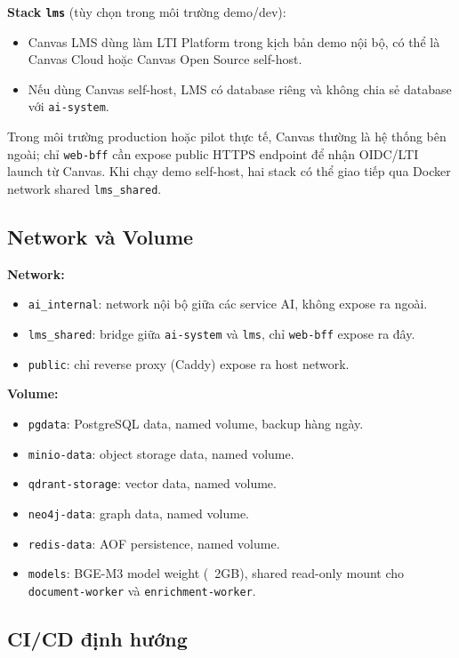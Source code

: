 \textbf{Stack \texttt{lms}} (tùy chọn trong môi trường demo/dev):
\begin{itemize}
    \item Canvas LMS dùng làm LTI Platform trong kịch bản demo nội bộ, có thể
          là Canvas Cloud hoặc Canvas Open Source self-host.
    \item Nếu dùng Canvas self-host, LMS có database riêng và không chia sẻ
          database với \texttt{ai-system}.
\end{itemize}

Trong môi trường production hoặc pilot thực tế, Canvas thường là hệ thống bên
ngoài; chỉ \texttt{web-bff} cần expose public HTTPS endpoint để nhận OIDC/LTI
launch từ Canvas. Khi chạy demo self-host, hai stack có thể giao tiếp qua Docker
network shared \texttt{lms\_shared}.

\subsection{Network và Volume}

\textbf{Network:}
\begin{itemize}
    \item \texttt{ai\_internal}: network nội bộ giữa các service AI, không
          expose ra ngoài.
    \item \texttt{lms\_shared}: bridge giữa \texttt{ai-system} và
          \texttt{lms}, chỉ \texttt{web-bff} expose ra đây.
    \item \texttt{public}: chỉ reverse proxy (Caddy) expose ra
          host network.
\end{itemize}

\textbf{Volume:}
\begin{itemize}
    \item \texttt{pgdata}: PostgreSQL data, named volume, backup hàng ngày.
    \item \texttt{minio-data}: object storage data, named volume.
    \item \texttt{qdrant-storage}: vector data, named volume.
    \item \texttt{neo4j-data}: graph data, named volume.
    \item \texttt{redis-data}: AOF persistence, named volume.
    \item \texttt{models}: BGE-M3 model weight (~2GB), shared read-only mount
          cho \texttt{document-worker} và \texttt{enrichment-worker}.
\end{itemize}

\subsection{CI/CD định hướng}

